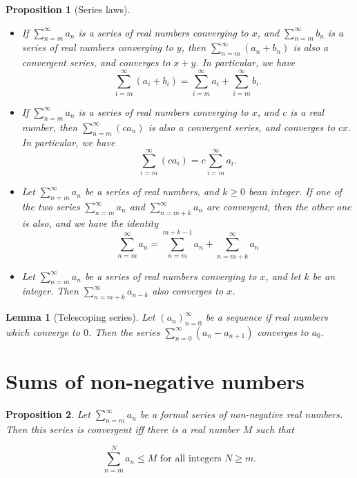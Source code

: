 \documentclass[
]{book}
\providecommand{\tightlist}{%
  \setlength{\itemsep}{0pt}\setlength{\parskip}{0pt}}
\newtheorem{lemma}{Lemma}[chapter]
\newtheorem{proposition}{Proposition}[chapter]
\theoremstyle{definition}
\theoremstyle{definition}
\theoremstyle{definition}
\theoremstyle{definition}
\theoremstyle{remark}
\begin{document}
\begin{proposition}[Series laws]
\leavevmode

\begin{itemize}
\tightlist
\item
  If \(\sum_{n=m}^{\infty}a_n\) is a series of real numbers converging to \(x\), and \(\sum_{n=m}^{\infty}b_n\) is a series of real numbers converging to \(y\), then \(\sum_{n=m}^{\infty}(a_n+b_n)\) is also a convergent series, and converges to \(x+y\). In particular, we have
  \[
  \sum_{i=m}^{\infty}(a_i+b_i)=\sum_{i=m}^{\infty}a_i+\sum_{i=m}^{\infty}b_i.
  \]
\item
  If \(\sum_{n=m}^{\infty}a_n\) is a series of real numbers converging to \(x\), and \(c\) is a real number, then \(\sum_{n=m}^{\infty}(ca_n)\) is also a convergent series, and converges to \(cx\). In particular, we have
  \[
  \sum_{i=m}^{\infty}(ca_i)=c\sum_{i=m}^{\infty}a_i.
  \]
\item
  Let \(\sum_{n=m}^{\infty}a_n\) be a series of real numbers, and \(k\geq 0\) bean integer. If one of the two series \(\sum_{n=m}^{\infty}a_n\) and \(\sum_{n=m+k}^{\infty}a_n\) are convergent, then the other one is also, and we have the identity
  \[
  \sum_{n=m}^{\infty}a_n=\sum_{n=m}^{m+k-1}a_n+\sum_{n=m+k}^{\infty}a_n
  \]
\item
  Let \(\sum_{n=m}^{\infty}a_n\) be a series of real numbers converging to \(x\), and let \(k\) be an integer. Then \(\sum_{n=m+k}^{\infty}a_{n-k}\) also converges to \(x\).
\end{itemize}

\end{proposition}

\begin{lemma}[Telescoping series]
Let \((a_n)_{n=0}^{\infty}\) be a sequence if real numbers which converge to \(0\). Then the series \(\sum_{n=0}^{\infty}(a_n-a_{n+1})\) converges to \(a_0\).
\end{lemma}

\section{Sums of non-negative numbers}\label{sums-of-non-negative-numbers}

\begin{proposition}
Let \(\sum_{n=m}^{\infty}a_n\) be a formal series of non-negative real numbers. Then this series is convergent iff there is a real number \(M\) such that

\[
\sum_{n=m}^{N}a_n\leq M \text{ for all integers } N\geq m.
\]
\end{proposition}
\end{document}

